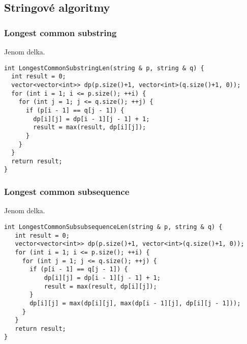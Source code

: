 \documentclass{article}
\begin{document}
\subsection{Stringové algoritmy}
\subsubsection{Longest common substring}
Jenom delka.
\begin{lstlisting}
int LongestCommonSubstringLen(string & p, string & q) {
  int result = 0;
  vector<vector<int>> dp(p.size()+1, vector<int>(q.size()+1, 0));
  for (int i = 1; i <= p.size(); ++i) {
    for (int j = 1; j <= q.size(); ++j) {
      if (p[i - 1] == q[j - 1]) {
        dp[i][j] = dp[i - 1][j - 1] + 1;
        result = max(result, dp[i][j]);
      }
    }
  }
  return result;
}
\end{lstlisting}

\subsubsection{Longest common subsequence}
Jenom delka.
\begin{lstlisting}
int LongestCommonSubsubsequenceLen(string & p, string & q) {
   int result = 0;
   vector<vector<int>> dp(p.size()+1, vector<int>(q.size()+1, 0));
   for (int i = 1; i <= p.size(); ++i) {
     for (int j = 1; j <= q.size(); ++j) {
       if (p[i - 1] == q[j - 1]) {
           dp[i][j] = dp[i - 1][j - 1] + 1;
           result = max(result, dp[i][j]);
       }
       dp[i][j] = max(dp[i][j], max(dp[i - 1][j], dp[i][j - 1]));
     }
   }
   return result;
}
\end{lstlisting}
\end{document}
